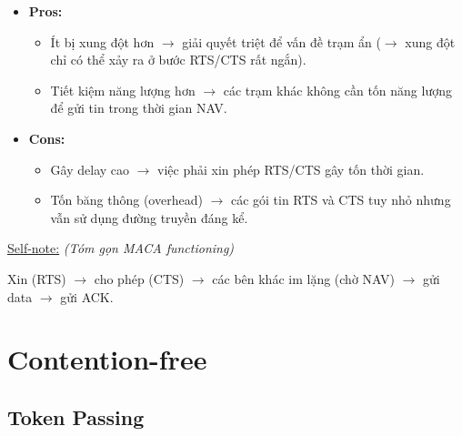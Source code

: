 \noindent
\begin{itemize}
    \item \textbf{Pros:} \begin{itemize}
        \item Ít bị xung đột hơn $\rightarrow$ giải quyết triệt để vấn đề trạm ẩn ($\rightarrow$ xung đột chỉ có thể xảy ra ở bước RTS/CTS rất ngắn).
        \item Tiết kiệm năng lượng hơn $\rightarrow$ các trạm khác không cần tốn năng lượng để gửi tin trong thời gian NAV.
    \end{itemize}
    \item \textbf{Cons:} \begin{itemize}
        \item Gây delay cao $\rightarrow$ việc phải xin phép RTS/CTS gây tốn thời gian.
        \item Tốn băng thông (overhead) $\rightarrow$ các gói tin RTS và CTS tuy nhỏ nhưng vẫn sử dụng đường truyền đáng kể.
    \end{itemize}
\end{itemize}
\medskip

\noindent
\underline{Self-note:} \textit{(Tóm gọn MACA functioning)}
\medskip

\noindent
Xin (RTS) $\rightarrow$ cho phép (CTS) $\rightarrow$ các bên khác im lặng (chờ NAV) $\rightarrow$ gửi data $\rightarrow$ gửi ACK.
\medskip

\section{Contention-free}

\subsection{Token Passing}

